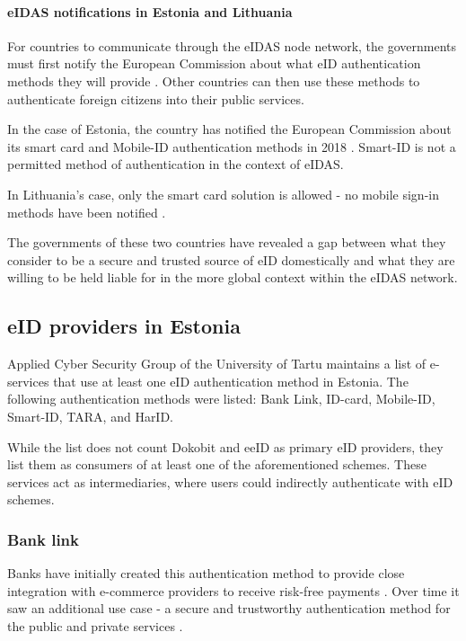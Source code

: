 \paragraph{eIDAS notifications in Estonia and Lithuania}

For countries to communicate through the eIDAS node network, the governments must first notify the European Commission about what eID authentication methods they will provide \cite{eulaw-eidas}. Other countries can then use these methods to authenticate foreign citizens into their public services.

In the case of Estonia, the country has notified the European Commission about its smart card and Mobile-ID authentication methods in 2018 \cite{eulaw-eidas-notified}. Smart-ID is not a permitted method of authentication in the context of eIDAS.

In Lithuania's case, only the smart card solution is allowed - no mobile sign-in methods have been notified \cite{eulaw-eidas-notified}.

The governments of these two countries have revealed a gap between what they consider to be a secure and trusted source of eID domestically and what they are willing to be held liable for in the more global context within the eIDAS network.

\subsection{eID providers in Estonia}

Applied Cyber Security Group of the University of Tartu maintains a list of e-services \cite{ut-eidinestonia} that use at least one eID authentication method in Estonia. The following authentication methods were listed: Bank Link, ID-card, Mobile-ID, Smart-ID, TARA, and HarID.

While the list does not count Dokobit and eeID as primary eID providers, they list them as consumers of at least one of the aforementioned schemes. These services act as intermediaries, where users could indirectly authenticate with eID schemes.

\subsubsection{Bank link}

Banks have initially created this authentication method to provide close integration with e-commerce providers to receive risk-free payments \cite{kerem2003internet}. Over time it saw an additional use case - a secure and trustworthy authentication method for the public and private services \cite{sebbanklink}.

